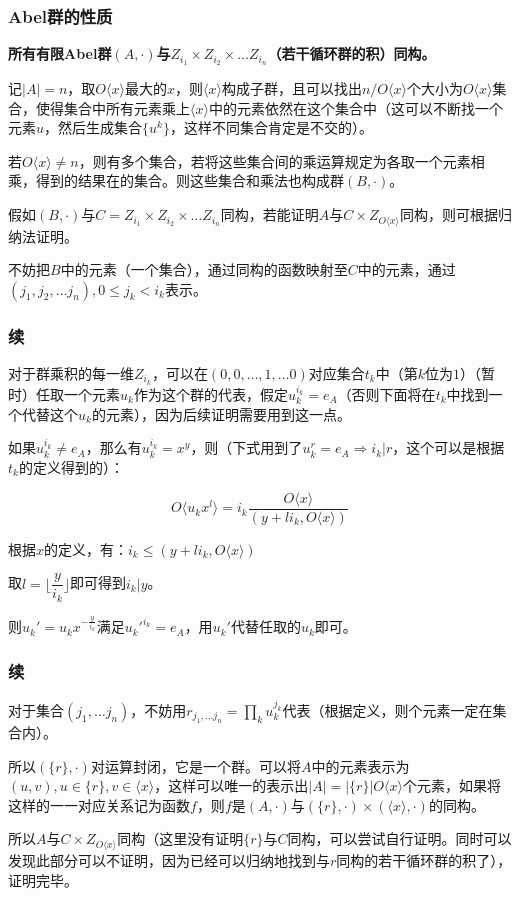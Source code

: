\documentclass[10pt]{beamer}
\begin{document}
	\begin{frame}
		\frametitle{Abel群的性质}
	
		\textbf{所有有限Abel群$(A,\cdot)$与$Z_{i_1}\times Z_{i_2}\times \dots Z_{i_n}$（若干循环群的积）同构。}
		
		记$|A|=n$，取$O\langle x\rangle $最大的$x$，则$\langle x\rangle $构成子群，且可以找出$n/O\langle x\rangle $个大小为$O\langle x\rangle $集合，使得集合中所有元素乘上$\langle x\rangle $中的元素依然在这个集合中（这可以不断找一个元素$u$，然后生成集合$\{u^k\}$，这样不同集合肯定是不交的）。

		若$O\langle x\rangle \not=n$，则有多个集合，若将这些集合间的乘运算规定为各取一个元素相乘，得到的结果在的集合。则这些集合和乘法也构成群$(B,\cdot)$。

		假如$(B,\cdot)$与$C=Z_{i_1}\times Z_{i_2}\times \dots Z_{i_n}$同构，若能证明$A$与$C\times Z_{O\langle x\rangle }$同构，则可根据归纳法证明。

		不妨把$B$中的元素（一个集合），通过同构的函数映射至$C$中的元素，通过$(j_1,j_2,\dots j_n),0\le j_k<i_k$表示。
	\end{frame}
	\begin{frame}
		\frametitle{续}
	
		对于群乘积的每一维$Z_{i_k}$，可以在$(0,0,\dots,1,\dots 0)$对应集合$t_k$中（第$k$位为$1$）（暂时）任取一个元素$u_k$作为这个群的代表，假定$u_k^{i_k}=e_A$（否则下面将在$t_k$中找到一个代替这个$u_k$的元素），因为后续证明需要用到这一点。

		如果$u_k^{i_k}\not=e_A$，那么有$u_k^{i_k}=x^y$，则（下式用到了$u_k^r=e_A\Rightarrow i_k|r$，这个可以是根据$t_k$的定义得到的）：
		
		$$
			O\langle u_kx^l\rangle =i_k\dfrac{O\langle x\rangle }{(y+li_k,O\langle x\rangle )}
		$$

		根据$x$的定义，有：$i_k\le(y+li_k,O\langle x\rangle )$

		取$l=\lfloor\dfrac{y}{i_k}\rfloor$即可得到$i_k|y$。

		则$u_k'=u_kx^{-\frac y{i_k}}$满足$u_k'^{i_k}=e_A$，用$u_k'$代替任取的$u_k$即可。
	
	\end{frame}
	\begin{frame}
		\frametitle{续}
	
		对于集合$(j_1,\dots j_n)$，不妨用$r_{j_1,\dots j_n}=\prod_{k}u_k^{j_k}$代表（根据定义，则个元素一定在集合内）。

		所以$(\{r\},\cdot)$对运算封闭，它是一个群。可以将$A$中的元素表示为$(u,v),u\in \{r\},v\in \langle x\rangle $，这样可以唯一的表示出$|A|=|\{r\}|O\langle x\rangle $个元素，如果将这样的一一对应关系记为函数$f$，则$f$是$(A,\cdot)$与$(\{r\},\cdot)\times(\langle x\rangle ,\cdot)$的同构。

		所以$A$与$C\times Z_{O\langle x\rangle }$同构（这里没有证明$\{r\}$与$C$同构，可以尝试自行证明。同时可以发现此部分可以不证明，因为已经可以归纳地找到与$r$同构的若干循环群的积了），证明完毕。
	
	\end{frame}
\end{document}

